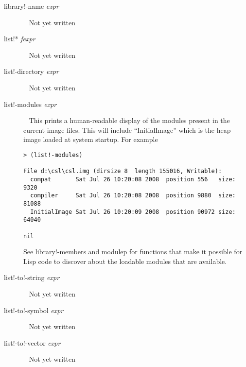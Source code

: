 \documentclass[a4paper,11pt]{article}
\begin{document}
\begin{description}
\item [{\ttfamily library!-name} {\itshape  expr}]  ~\newline
Not yet written

\item [{\ttfamily list!*} {\itshape  fexpr}]  ~\newline
Not yet written

\item [{\ttfamily list!-directory} {\itshape  expr}]  ~\newline
Not yet written
  

\item [{\ttfamily list!-modules} {\itshape  expr}]  ~\newline
This prints a human-readable display of the modules present in the current
image files. This will include ``InitialImage'' which is the heap-image
loaded at system startup. For example
{\footnotesize \begin{verbatim}
> (list!-modules)
  
File d:\csl\csl.img (dirsize 8  length 155016, Writable):
  compat       Sat Jul 26 10:20:08 2008  position 556   size: 9320
  compiler     Sat Jul 26 10:20:08 2008  position 9880  size: 81088
  InitialImage Sat Jul 26 10:20:09 2008  position 90972 size: 64040
  
nil
\end{verbatim}}
  
See {\ttfamily library!-members} and {\ttfamily modulep} for functions that
make it possible for Lisp code to discover about the loadable modules that are
available.

\item [{\ttfamily list!-to!-string} {\itshape  expr}]  ~\newline
Not yet written

\item [{\ttfamily list!-to!-symbol} {\itshape  expr}]  ~\newline
Not yet written

\item [{\ttfamily list!-to!-vector} {\itshape  expr}]  ~\newline
Not yet written


\end{description}
\end{document}
